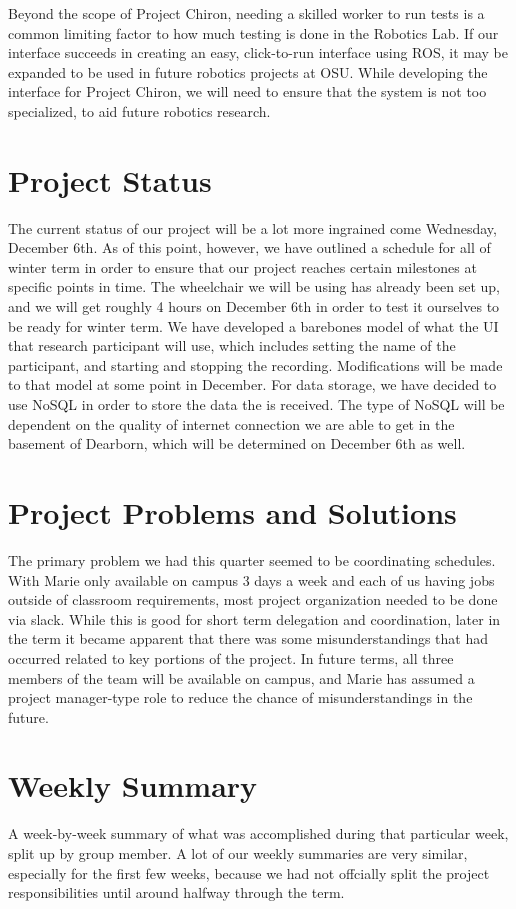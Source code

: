 \documentclass[onecolumn, draftclsnofoot,10pt, compsoc]{IEEEtran}
\begin{document}
Beyond the scope of Project Chiron, needing a skilled worker to run tests is a common limiting factor to how much testing is done in the Robotics Lab. If our interface succeeds in creating an easy, click-to-run interface using ROS, it may be expanded to be used in future robotics projects at OSU. While developing the interface for Project Chiron, we will need to ensure that the system is not too specialized, to aid future robotics research. 

\section{Project Status}
The current status of our project will be a lot more ingrained come Wednesday, December 6th. As of this point, however, we have outlined a schedule for all of winter term in order to ensure that our project reaches certain milestones at specific points in time. The wheelchair we will be using has already been set up, and we will get roughly 4 hours on December 6th in order to test it ourselves to be ready for winter term. We have developed a barebones model of what the UI that research participant will use, which includes setting the name of the participant, and starting and stopping the recording. Modifications will be made to that model at some point in December. For data storage, we have decided to use NoSQL in order to store the data the is received. The type of NoSQL will be dependent on the quality of internet connection we are able to get in the basement of Dearborn, which will be determined on December 6th as well.

\section{Project Problems and Solutions}
The primary problem we had this quarter seemed to be coordinating schedules. With Marie only available on campus 3 days a week and each of us having jobs outside of classroom requirements, most project organization needed to be done via slack. While this is good for short term delegation and coordination, later in the term it became apparent that there was some misunderstandings that had occurred related to key portions of the project. In future terms, all three members of the team will be available on campus, and Marie has assumed a project manager-type role to reduce the chance of misunderstandings in the future. 

\section{Weekly Summary}
A week-by-week summary of what was accomplished during that particular week, split up by group member. A lot of our weekly summaries are very similar, especially for the first few weeks, because we had not offcially split the project responsibilities until around halfway through the term.
\end{document}
